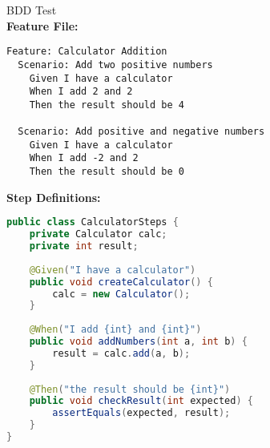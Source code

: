 \begin{example}{BDD Test}\\
\textbf{Feature File:}
\begin{lstlisting}[style=basesmol]
Feature: Calculator Addition
  Scenario: Add two positive numbers
    Given I have a calculator
    When I add 2 and 2
    Then the result should be 4
    
  Scenario: Add positive and negative numbers
    Given I have a calculator
    When I add -2 and 2
    Then the result should be 0
\end{lstlisting}

\textbf{Step Definitions:}
\begin{lstlisting}[language=Java, style=base]
public class CalculatorSteps {
    private Calculator calc;
    private int result;
    
    @Given("I have a calculator")
    public void createCalculator() {
        calc = new Calculator();
    }
    
    @When("I add {int} and {int}")
    public void addNumbers(int a, int b) {
        result = calc.add(a, b);
    }
    
    @Then("the result should be {int}")
    public void checkResult(int expected) {
        assertEquals(expected, result);
    }
}
\end{lstlisting}
\end{example}

